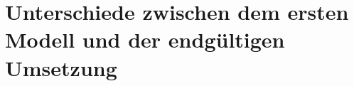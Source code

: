 \documentclass[./\jobname.tex]{subfiles}
\begin{document}
%
%
\chapter{Unterschiede zwischen dem ersten Modell und der endgültigen Umsetzung}
%
\end{document}
